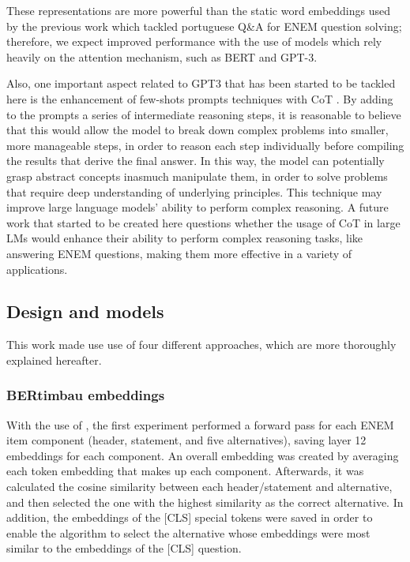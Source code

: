 \documentclass{article}
\begin{document}
These representations are more powerful than the static word embeddings \cite{MikolovEfficientEstimationWord2013a} used by the previous work \cite{8575587} which tackled portuguese Q\&A for ENEM question solving; therefore, we expect improved performance with the use of models which rely heavily on the attention mechanism, such as BERT and GPT-3.

Also, one important aspect related to GPT3 that has been started to be tackled here is the enhancement of few-shots prompts techniques with CoT \cite{DBLP:journals/corr/abs-2201-11903}. By adding to the prompts a series of intermediate reasoning steps, it is reasonable to believe that this would allow the model to break down complex problems into smaller, more manageable steps, in order to reason each step individually before compiling the results that derive the final answer. In this way, the model can potentially grasp abstract concepts inasmuch manipulate them, in order to solve problems that require deep understanding of underlying principles. This technique may improve large language models' ability to perform complex reasoning. A future work that started to be created here questions whether the usage of CoT in large LMs would enhance their ability to perform complex reasoning tasks, like answering ENEM questions, making them more effective in a variety of applications.

\subsection{Design and models}

This work made use use of four different approaches, which are more thoroughly explained hereafter.

\subsubsection{\textbf{BERtimbau embeddings}}

With the use of \cite{souza2020bertimbau}, the first experiment performed a forward pass for each ENEM item component (header, statement, and five alternatives), saving layer 12 embeddings  for each component. An overall embedding was created by averaging each token embedding that makes up each component. Afterwards, it was calculated the cosine similarity between each header/statement and alternative, and then selected the one with the highest similarity as the correct alternative. In addition, the embeddings of the [CLS] special tokens were saved in order to enable the algorithm to select the alternative whose embeddings were most similar to the embeddings of the [CLS] question.
\end{document}
